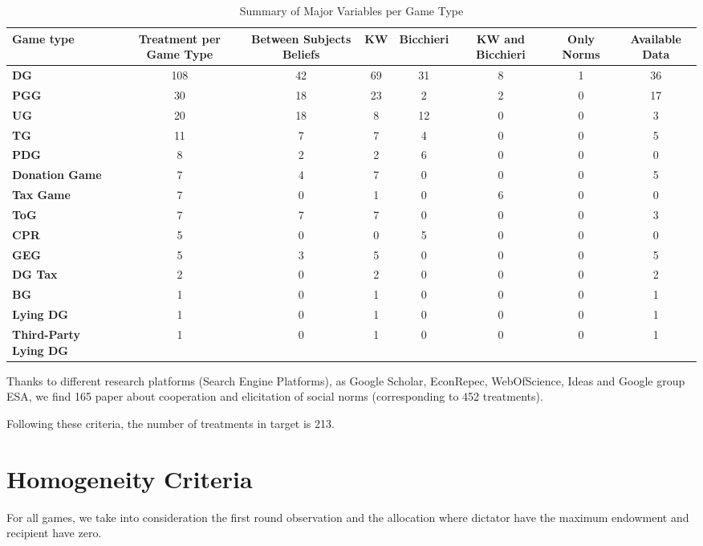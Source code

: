 \documentclass[
]{article}
\begin{document}
\begin{table}

\caption{\label{tab:unnamed-chunk-2}Summary of Major Variables per Game Type}
\begin{tabular}[t]{>{}lccccccc}
\toprule
Game type & Treatment per Game Type & Between Subjects Beliefs & KW & Bicchieri & KW and Bicchieri & Only Norms & Available Data\\
\midrule
\textbf{DG} & 108 & 42 & 69 & 31 & 8 & 1 & 36\\
\textbf{PGG} & 30 & 18 & 23 & 2 & 2 & 0 & 17\\
\textbf{UG} & 20 & 18 & 8 & 12 & 0 & 0 & 3\\
\textbf{TG} & 11 & 7 & 7 & 4 & 0 & 0 & 5\\
\textbf{PDG} & 8 & 2 & 2 & 6 & 0 & 0 & 0\\
\addlinespace
\textbf{Donation Game} & 7 & 4 & 7 & 0 & 0 & 0 & 5\\
\textbf{Tax Game} & 7 & 0 & 1 & 0 & 6 & 0 & 0\\
\textbf{ToG} & 7 & 7 & 7 & 0 & 0 & 0 & 3\\
\textbf{CPR} & 5 & 0 & 0 & 5 & 0 & 0 & 0\\
\textbf{GEG} & 5 & 3 & 5 & 0 & 0 & 0 & 5\\
\addlinespace
\textbf{DG Tax} & 2 & 0 & 2 & 0 & 0 & 0 & 2\\
\textbf{BG} & 1 & 0 & 1 & 0 & 0 & 0 & 1\\
\textbf{Lying DG} & 1 & 0 & 1 & 0 & 0 & 0 & 1\\
\textbf{Third-Party Lying DG} & 1 & 0 & 1 & 0 & 0 & 0 & 1\\
\bottomrule
\end{tabular}
\end{table}

Thanks to different research platforms (Search Engine Platforms), as
Google Scholar, EconRepec, WebOfScience, Ideas and Google group ESA, we
find 165 paper about cooperation and elicitation of social norms
(corresponding to 452 treatments).

Following these criteria, the number of treatments in target is 213.

\hypertarget{homogeneity-criteria}{%
\section{Homogeneity Criteria}\label{homogeneity-criteria}}

For all games, we take into consideration the first round observation
and the allocation where dictator have the maximum endowment and
recipient have zero.
\end{document}
